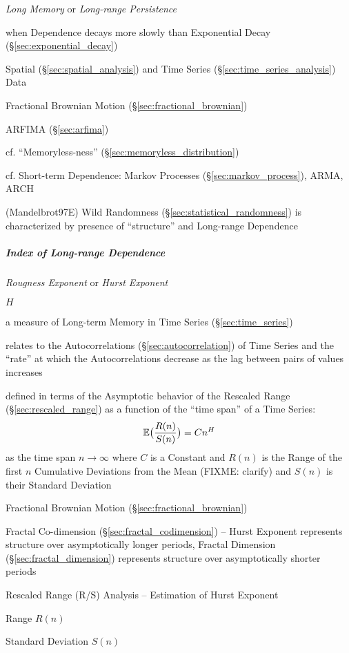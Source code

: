 \emph{Long Memory} or \emph{Long-range Persistence}

when Dependence decays more slowly than Exponential Decay
(\S\ref{sec:exponential_decay})

Spatial (\S\ref{sec:spatial_analysis}) and Time Series
(\S\ref{sec:time_series_analysis}) Data

\fist Fractional Brownian Motion (\S\ref{sec:fractional_brownian})

\fist ARFIMA (\S\ref{sec:arfima})

cf. ``Memoryless-ness'' (\S\ref{sec:memoryless_distribution})

cf. Short-term Dependence: Markov Processes (\S\ref{sec:markov_process}), ARMA,
ARCH

(Mandelbrot97E) Wild Randomness (\S\ref{sec:statistical_randomness}) is
characterized by presence of ``structure'' and Long-range Dependence



\subparagraph{Index of Long-range Dependence}\label{sec:hurst_exponent}\hfill

\emph{Rougness Exponent} or \emph{Hurst Exponent}

$H$

a measure of Long-term Memory in Time Series (\S\ref{sec:time_series})

relates to the Autocorrelations (\S\ref{sec:autocorrelation}) of Time Series and
the ``rate'' at which the Autocorrelations decrease as the lag between pairs of
values increases

defined in terms of the Asymptotic behavior of the Rescaled Range
(\S\ref{sec:rescaled_range}) as a function of the ``time span'' of a Time
Series:
\[
  \mathbb{E}\big(\frac{R(n)}{S(n)}\big) = Cn^H
\]
as the time span $n \to \infty$ where $C$ is a Constant and $R(n)$ is the Range
of the first $n$ Cumulative Deviations from the Mean (FIXME: clarify) and $S(n)$
is their Standard Deviation

Fractional Brownian Motion (\S\ref{sec:fractional_brownian})

Fractal Co-dimension (\S\ref{sec:fractal_codimension}) -- Hurst Exponent
represents structure over asymptotically longer periods, Fractal Dimension
(\S\ref{sec:fractal_dimension}) represents structure over asymptotically shorter
periods

Rescaled Range (R/S) Analysis -- Estimation of Hurst Exponent

Range $R(n)$

Standard Deviation $S(n)$

